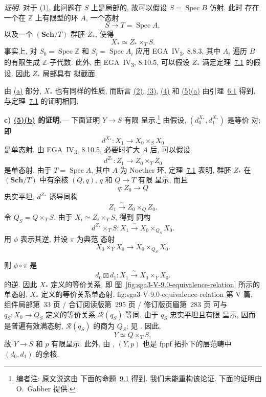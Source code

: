 \noindent\textit{证明.} 对于 \hyperref[thm:sga3-V-9.0-1]{(1)}, 此问题在 \(S\) 上是局部的,
故可以假设 \(S=\operatorname{Spec}B\) 仿射. 此时
存在一个在 \(\mathbb Z\) 上有限型的环 \(A\), 一个态射
\[
  S\longrightarrow T=\operatorname{Spec}A,
\]
以及一个 \((\mathbf{Sch}/T)\)-群胚 \(Z_\ast\), 使得
\[
  X_\ast\simeq Z_\ast\times_T S.
\]
事实上, 对
\(S_0=\operatorname{Spec}\mathbb Z\) 和
\(S_i=\operatorname{Spec}A_i\) 应用 EGA~IV\textsubscript{3}, 8.8.3,
其中 \(A_i\) 遍历 \(B\) 的有限生成
\(\mathbb Z\)-子代数. 此外, 由
EGA~IV\textsubscript{3}, 8.10.5, 可以假设 \(Z_\ast\)
满足定理~\hyperref[thm:sga3-V-7.1]{7.1} 的假设.
因此 \(Z_\ast\) 局部具有
拟截面.

由 \hyperref[par:sga3-V-9-a]{(a)} 部分, \(X_\ast\) 也有同样的性质,
而断言 \hyperref[thm:sga3-V-9.0-2]{(2)}, \hyperref[thm:sga3-V-9.0-3]{(3)}, \hyperref[thm:sga3-V-9.0-4]{(4)} 和 \hyperref[thm:sga3-V-9.0-5-a]{(5)(a)}
由引理~\hyperref[lem:sga3-V-6.1]{6.1} 得到,
与定理~\hyperref[thm:sga3-V-7.1]{7.1} 的证明相同.

\medskip
{}\label{proof:sga3-V-9.0-c}%
\noindent\textbf{c) \hyperref[thm:sga3-V-9.0-5-b]{(5)(b)} 的证明.}---%
下面证明 \(Y\to S\) 有限
呈示.\footnote{\label{note:sga3-V-47}编者注: 原文说这由
下面的命题~\hyperref[sga3:v:proposition:9:1]{9.1} 得到.
我们未能重构该论证.
下面的证明由 O.~Gabber 提供.}
由假设, \((d_0^{X_\ast},d_1^{X_\ast})\) 是等价
对; 即
\[
  d^{X_\ast}:X_1\longrightarrow X_0\times_S X_0
\]
是单态射. 由 EGA~IV\textsubscript{3}, 8.10.5, 必要时扩大
\(A\) 后, 可以假设
\[
  d^{Z_\ast}:Z_1\longrightarrow Z_0\times_T Z_0
\]
是单态射. 由于 \(T=\operatorname{Spec}A\), 其中 \(A\)
为 Noether 环, 定理~\hyperref[thm:sga3-V-7.1]{7.1} 表明,
群胚 \(Z_\ast\) 在
\((\mathbf{Sch}/T)\) 中有余核 \((Q,q)\), \(q\) 和 \(Q\to T\) 有限
呈示, 而且
\[
  q:Z_0\longrightarrow Q
\]
忠实平坦, \(d^{Z_\ast}\) 诱导同构
\[
  Z_1\xrightarrow{\ \sim\ }Z_0\times_Q Z_0.
\]
令 \(Q_S=Q\times_T S\). 由于 \(X_i\simeq Z_i\times_T S\), 得到
同构
\[
  d^{Z_\ast}\times_T S:
  X_1\xrightarrow{\ \sim\ }X_0\times_{Q_S}X_0.
\]
用 \(\phi\) 表示其逆, 并设 \(\pi\) 为典范
态射
\[
  X_0\times_Y X_0\longrightarrow X_0\times_{Q_S}X_0.
\]

则 \(\phi\circ\pi\) 是
\[
  d_0\boxtimes d_1:
  X_1\xrightarrow{\ \sim\ }X_0\times_Y X_0.
\]
的逆. 因此 \(X_\ast\) 定义的等价关系, 即
图~\hyperref[fig:sga3-V-9.0-equivalence-relation]{\ref*{fig:sga3-V-9.0-equivalence-relation}}
所示的单态射,
  {\(X_\ast\) 定义的等价关系单态射.}
  {fig:sga3-V-9.0-equivalence-relation}
  {第 V 篇, 组件局部第~33 页 / 合订阅读版第~295 页 / 修订版页眉第~283 页}
可与 \(q_S:X_0\to Q_S\) 定义的等价关系
\(\mathscr R(q_S)\) 等同. 由于 \(q_S\) 忠实平坦且有限
呈示, 因而是普遍有效满态射,
\(\mathscr R(q_S)\) 的商为 \(Q_S\); 见 .
因此,
\[
  Y\simeq Q\times_T S,
\]
故 \(Y\to S\) 和 \(p\) 有限呈示. 此外, 由
, \((Y,p)\) 也是 fppf 拓扑下的层范畴中
\((d_0,d_1)\) 的余核.

